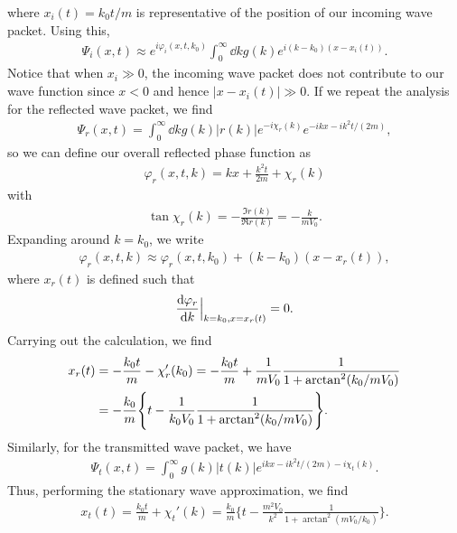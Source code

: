 where $x_{i}(t) = k_0 t / m$ is representative of the position of our incoming wave packet.
Using this, 
\begin{align}
    \Psi_{i}(x,t) \approx e^{i \varphi_{i}(x,t,k_{0})} \int_{0}^{\infty} \dd{k} g(k) e^{i (k - k_0) (x - x_{i}(t))}
.\end{align}
Notice that when $x_{i} \gg 0$, the incoming wave packet does not contribute to our wave function since $x < 0$ and hence $|x - x_{i}(t)| \gg 0$.
If we repeat the analysis for the reflected wave packet, we find
\begin{align}
    \Psi_{r}(x,t) = \int_{0}^{\infty} \dd{k} g(k) |r(k)| e^{-i \chi_{r}(k)} e^{-i k x - i k^2 t / (2m)}
,\end{align}
so we can define our overall reflected phase function as
\begin{align}
    \varphi_{r}(x,t,k) = kx + \frac{k^2 t}{2m} + \chi_{r}(k)
\end{align}
with
\begin{align}
    \tan{\chi_{r}(k)} = - \frac{\Im{r(k)}}{\Re{r(k)}} = -\frac{k}{m V_0}
.\end{align}
Expanding around $k = k_0$, we write
\begin{align}
    \varphi_{r}(x,t,k) \approx \varphi_{r}(x,t,k_0) + (k - k_0) (x - x_{r}(t))
,\end{align}
where $x_{r}(t)$ is defined such that
\begin{align}
    \dv{\varphi_{r}}{k}\Big|_{k=k_0,x=x_{r}(t)} = 0 
.\end{align}
Carrying out the calculation, we find
\begin{align}
    x_{r}(t) &= - \frac{k_0 t}{m} - \chi_{r}'(k_0) = -\frac{k_0 t}{m} + \frac{1}{m V_0} \frac{1}{1 + {\rm arctan}^2(k_0 / m V_0)} \nonumber \\
    &= -\frac{k_0}{m} \Bigg\{ t - \frac{1}{k_0 V_0} \frac{1}{1 + \arctan^2(k_0/m V_0)} \Bigg\}
.\end{align}
Similarly, for the transmitted wave packet, we have
\begin{align}
    \Psi_{t}(x,t) = \int_{0}^{\infty} g(k) |t(k)| e^{i k x - i k^2 t / (2m) - i \chi_{t}(k)}
.\end{align}
Thus, performing the stationary wave approximation, we find
\begin{align}
    x_{t}(t) = \frac{k_0 t}{m} + \chi_{t}'(k) = \frac{k_0}{m} \Bigg\{ t - \frac{m^2 V_0}{k^2} \frac{1}{1 + \arctan^2(m V_0 / k_0)} \Bigg\}
.\end{align}


